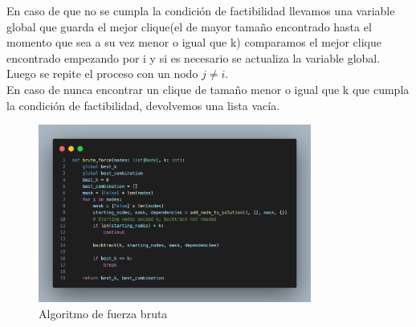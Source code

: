 \documentclass[sn-mathphys,Numbered]{sn-jnl}%
\theoremstyle{thmstyleone}%
\theoremstyle{thmstyletwo}%
\theoremstyle{thmstylethree}%
\begin{document}
En caso de que no se cumpla la condición de factibilidad llevamos una variable global que guarda el mejor clique(el de mayor tama\~no encontrado hasta el momento que sea a su vez menor o igual que k) comparamos el mejor clique encontrado empezando por i y si es necesario se actualiza la variable global.\\
Luego se repite el proceso con un nodo $j \neq i$.\\
 En caso de nunca encontrar un clique de tama\~no menor o igual que k que cumpla la condici\'on de factibilidad, devolvemos una lista vac\'ia.\\
\begin{figure}[h]
        \centering
        \includegraphics[height=0.3\textheight, width=0.8\textwidth]{brute_force.png}
        \centering
        \caption{Algoritmo de fuerza bruta}
\end{figure}
\end{document}
